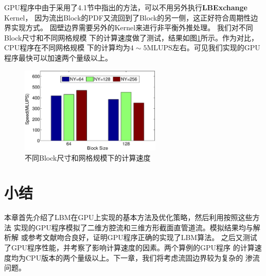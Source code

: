 GPU程序中由于采用了4.1节中指出的方法，可以不用另外执行\textbf{LBExchange} Kernel，
因为流出Block的PDF又流回到了Block的另一侧，这正好符合周期性边界实现方式。
固壁边界需要另外的Kernel来进行非平衡外推处理。 我们对不同Block尺寸和不同网格规模
下的计算速度做了测试，结果如图\ref{fig:sq_speed}所示。作为对比，CPU程序在不同网格规模
下的计算均为$4\sim5$MLUPS左右。可见我们实现的GPU程序最快可以加速两个量级以上。
\begin{figure}[htb]
  \centering
  \includegraphics[width=0.6\textwidth]{img/sq_speed}
  \caption{不同Block尺寸和网格规模下的计算速度}
  \label{fig:sq_speed}
\end{figure}

\section{小结}
本章首先介绍了LBM在GPU上实现的基本方法及优化策略，然后利用按照这些方法
实现的GPU程序模拟了二维方腔流和三维方形截面直管道流。模拟结果均与解析解
或参考文献吻合良好，证明GPU程序正确的实现了LBM算法。
之后又测试了GPU程序性能，并考察了影响计算速度的因素。两个算例的GPU程序
的计算速度均为CPU版本的两个量级以上。下一章，我们将考虑流固边界较为复杂的
渗流问题。


